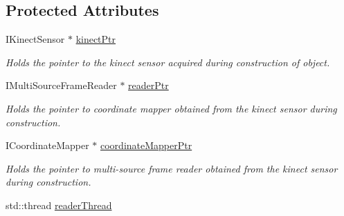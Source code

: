 \subsection*{Protected Attributes}
\begin{DoxyCompactItemize}
\item 
\hypertarget{classpersonal_robotics_1_1_kinect_reader_a3c69a0735db377ac7b88a99921c10d5f}{}I\+Kinect\+Sensor $\ast$ \hyperlink{classpersonal_robotics_1_1_kinect_reader_a3c69a0735db377ac7b88a99921c10d5f}{kinect\+Ptr}\label{classpersonal_robotics_1_1_kinect_reader_a3c69a0735db377ac7b88a99921c10d5f}

\begin{DoxyCompactList}\small\item\em Holds the pointer to the kinect sensor acquired during construction of object. \end{DoxyCompactList}\item 
\hypertarget{classpersonal_robotics_1_1_kinect_reader_ab4f2a7d08cb1b7d4452e6d8e5d28170e}{}I\+Multi\+Source\+Frame\+Reader $\ast$ \hyperlink{classpersonal_robotics_1_1_kinect_reader_ab4f2a7d08cb1b7d4452e6d8e5d28170e}{reader\+Ptr}\label{classpersonal_robotics_1_1_kinect_reader_ab4f2a7d08cb1b7d4452e6d8e5d28170e}

\begin{DoxyCompactList}\small\item\em Holds the pointer to coordinate mapper obtained from the kinect sensor during construction. \end{DoxyCompactList}\item 
\hypertarget{classpersonal_robotics_1_1_kinect_reader_a9970b3d07116313d5503d48a34beb4c1}{}I\+Coordinate\+Mapper $\ast$ \hyperlink{classpersonal_robotics_1_1_kinect_reader_a9970b3d07116313d5503d48a34beb4c1}{coordinate\+Mapper\+Ptr}\label{classpersonal_robotics_1_1_kinect_reader_a9970b3d07116313d5503d48a34beb4c1}

\begin{DoxyCompactList}\small\item\em Holds the pointer to multi-\/source frame reader obtained from the kinect sensor during construction. \end{DoxyCompactList}\item 
\hypertarget{classpersonal_robotics_1_1_kinect_reader_afe24150fcff220507b3d9dcd9d0bee97}{}std\+::thread \hyperlink{classpersonal_robotics_1_1_kinect_reader_afe24150fcff220507b3d9dcd9d0bee97}{reader\+Thread}\label{classpersonal_robotics_1_1_kinect_reader_afe24150fcff220507b3d9dcd9d0bee97}


\end{DoxyCompactItemize}
